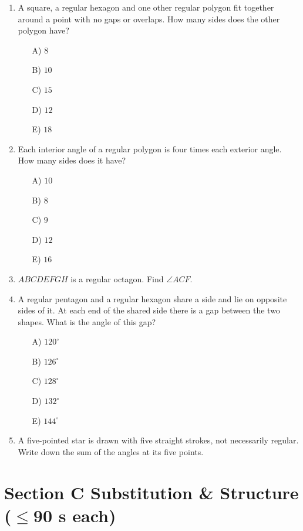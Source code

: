 \documentclass[11pt,a4paper]{article}
\begin{document}
\begin{enumerate}
\item A square, a regular hexagon and one other regular polygon fit together around a point with no gaps or overlaps. How many sides does the other polygon have?
\begin{itemize}
\item[A)] $8$
\item[B)] $10$
\item[C)] $15$
\item[D)] $12$
\item[E)] $18$
\end{itemize}

\item Each interior angle of a regular polygon is four times each exterior angle. How many sides does it have?
\begin{itemize}
\item[A)] $10$
\item[B)] $8$
\item[C)] $9$
\item[D)] $12$
\item[E)] $16$
\end{itemize}

\item $ABCDEFGH$ is a regular octagon. Find $\angle ACF$.

\item A regular pentagon and a regular hexagon share a side and lie on opposite sides of it. At each end of the shared side there is a gap between the two shapes. What is the angle of this gap?
\begin{itemize}
\item[A)] $120^\circ$
\item[B)] $126^\circ$
\item[C)] $128^\circ$
\item[D)] $132^\circ$
\item[E)] $144^\circ$
\end{itemize}

\item A five-pointed star is drawn with five straight strokes, not necessarily regular. Write down the sum of the angles at its five points.

\end{enumerate}

\section*{Section C \quad Substitution \& Structure \hfill{\normalfont\small($\leq$90 s each)}}
\end{document}
